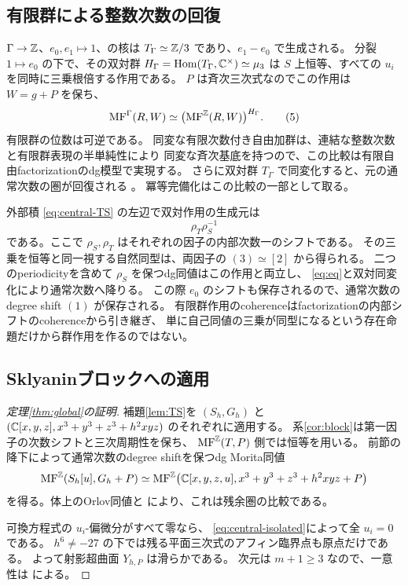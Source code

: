 \subsection{有限群による整数次数の回復}

\(\Gamma\to\mathbb Z\)、\(e_0,e_1\mapsto1\)、の核は
\(T_\Gamma\simeq\mathbb Z/3\) であり、\(e_1-e_0\) で生成される。
分裂 \(1\mapsto e_0\) の下で、その双対群
\(H_\Gamma=\operatorname{Hom}(T_\Gamma,\mathbb C^\times)\simeq\mu_3\) は
\(S\) 上恒等、すべての \(u_i\) を同時に三乗根倍する作用である。
\(P\) は斉次三次式なのでこの作用は \(W=g+P\) を保ち、
\[
 \operatorname{MF}^\Gamma(R,W)
 \simeq\bigl(\operatorname{MF}^\mathbb Z(R,W)\bigr)^{H_\Gamma}.                \tag{5}\label{eq:eq}
\]
有限群の位数は可逆である。
同変な有限次数付き自由加群は、連結な整数次数と有限群表現の半単純性により
同変な斉次基底を持つので、この比較は有限自由factorizationのdg模型で実現する。
さらに双対群 \(T_\Gamma\) で同変化すると、元の通常次数の圏が回復される
\cite[Theorem 4.2, Section 8, Lemma 8.6, Theorem 8.9]{Elagin}。
冪等完備化はこの比較の一部として取る。

外部積 \eqref{eq:central-TS} の左辺で双対作用の生成元は
\[
 \rho_T\rho_S^{-1}
\]
である。ここで \(\rho_S,\rho_T\) はそれぞれの因子の内部次数一のシフトである。
その三乗を恒等と同一視する自然同型は、両因子の
\((3)\simeq[2]\) から得られる。
二つのperiodicityを含めて \(\rho_S\) を保つdg同値はこの作用と両立し、
\eqref{eq:eq}と双対同変化により通常次数へ降りる。
この際 \(e_0\) のシフトも保存されるので、通常次数のdegree shift \((1)\) が保存される。
有限群作用のcoherenceはfactorizationの内部シフトのcoherenceから引き継ぎ、
単に自己同値の三乗が同型になるという存在命題だけから群作用を作るのではない。

\subsection{Sklyaninブロックへの適用}

\begin{proof}[定理\ref{thm:global}の証明]
 補題\ref{lem:TS}を \((S_h,G_h)\) と
 \((\mathbb C[x,y,z],x^3+y^3+z^3+h^2xyz)\) のそれぞれに適用する。
 系\ref{cor:block}は第一因子の次数シフトと三次周期性を保ち、
 \(\operatorname{MF}^\mathbb Z(T,P)\) 側では恒等を用いる。
 前節の降下によって通常次数のdegree shiftを保つdg Morita同値
 \[
 \operatorname{MF}^\mathbb Z(S_h[u],G_h+P)
 \simeq
 \operatorname{MF}^\mathbb Z\!\left(\mathbb C[x,y,z,u],x^3+y^3+z^3+h^2xyz+P\right)
 \]
 を得る。体上のOrlov同値と \cite{CCKM} により、これは残余圏の比較である。

 可換方程式の \(u_i\)-偏微分がすべて零なら、
 \eqref{eq:central-isolated}によって全 \(u_i=0\) である。
 \(h^6\ne-27\) の下では残る平面三次式のアフィン臨界点も原点だけである。
 よって射影超曲面 \(Y_{h,P}\) は滑らかである。
 次元は \(m+1\ge3\) なので、一意性は \cite[Theorem 1.7]{LZ} による。
\end{proof}



